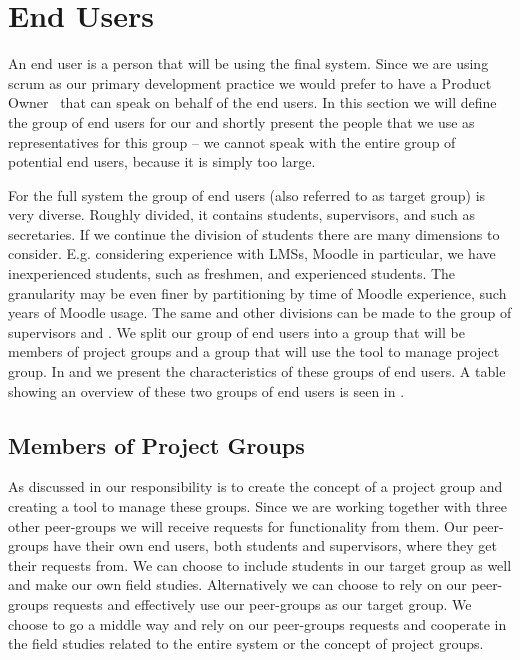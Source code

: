 \section{End Users}
\label{sec:enduser}
An end user is a person that will be using the final system.
Since we are using scrum as our primary development practice we would prefer to have a Product Owner~\cite[p.~115]{Larman04} that can speak on behalf of the end users.
In this section we will define the group of end users for our \subsystem{} and shortly present the people that we use as representatives for this group -- we cannot speak with the entire group of potential end users, because it is simply too large.

For the full system the group of end users (also referred to as target group) is very diverse.
Roughly divided, it contains students, supervisors, and \admpers{} such as secretaries.
If we continue the division of students there are many dimensions to consider. 
E.g. considering experience with LMSs, Moodle in particular, we have inexperienced students, such as freshmen, and experienced students.
The granularity may be even finer by partitioning by time of Moodle experience, such years of Moodle usage.
The same and other divisions can be made to the group of supervisors and \admpers{}.
We split our group of end users into a group that will be members of project groups and a group that will use the tool to manage project group.
In  and  we present the characteristics of these groups of end users.
A table showing an overview of these two groups of end users is seen in .

\subsection{Members of Project Groups}
\label{sub:endusersmembers}
As discussed in  our responsibility is to create the concept of a project group and creating a tool to manage these groups.
Since we are working together with three other peer-groups we will receive requests for functionality from them.
Our peer-groups have their own end users, both students and supervisors, where they get their requests from.
We can choose to include students in our target group as well and make our own field studies.
Alternatively we can choose to rely on our peer-groups requests and effectively use our peer-groups as our target group.
We choose to go a middle way and rely on our peer-groups requests and cooperate in the field studies related to the entire system or the concept of project groups.

